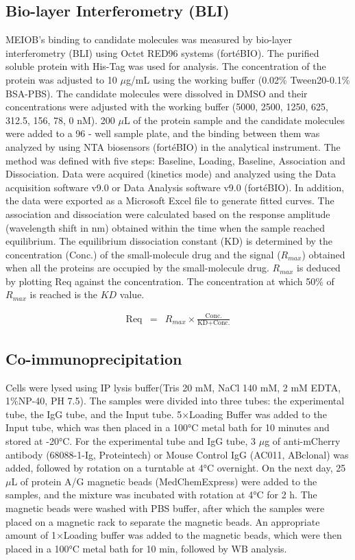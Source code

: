 \documentclass[unnumsec,webpdf,contemporary,large]{oup-authoring-template}%
\theoremstyle{thmstyleone}%
\theoremstyle{thmstyletwo}%
\theoremstyle{thmstylethree}%
\begin{document}
\subsection*{Bio-layer Interferometry (BLI)}

MEIOB's binding to candidate molecules was measured by bio-layer interferometry (BLI) using Octet RED96 systems (fortéBIO). The purified soluble protein with His-Tag was used for analysis. The concentration of the protein was adjusted to 10 $\mu$g/mL using the working buffer (0.02\% Tween20-0.1\% BSA-PBS). The candidate molecules were dissolved in DMSO and their concentrations were adjusted with the working buffer (5000, 2500, 1250, 625, 312.5, 156, 78, 0 nM). 200 $\mu$L of the protein sample and the candidate molecules were added to a 96 - well sample plate, and the binding between them was analyzed by using NTA biosensors (fortéBIO) in the analytical instrument. The method was defined with five steps: Baseline, Loading, Baseline, Association and Dissociation. Data were acquired (kinetics mode) and analyzed using the Data acquisition software v9.0 or Data Analysis software v9.0 (fortéBIO). In addition, the data were exported as a Microsoft Excel file to generate fitted curves. The association and dissociation were calculated based on the response amplitude (wavelength shift in nm) obtained within the time when the sample reached equilibrium. The equilibrium dissociation constant ($\text{KD}$) is determined by the concentration ($\text{Conc.}$) of the small-molecule drug and the signal ($R_{max}$) obtained when all the proteins are occupied by the small-molecule drug. $R_{max}$ is deduced by plotting $\text{Req}$ against the concentration. The concentration at which 50\% of $R_{max}$ is reached is the $KD$ value.

\begin{eqnarray}
\text{Req} & = & R_{max} \times  \frac{\text{Conc.}}{\text{KD} + \text{Conc.}} 
\end{eqnarray}


\subsection*{Co-immunoprecipitation}
Cells were lysed using IP lysis buffer(Tris 20 mM, NaCl 140 mM, 2 mM EDTA, 1\%NP-40, PH 7.5). The samples were divided into three tubes: the experimental tube, the IgG tube, and the Input tube. 5×Loading Buffer was added to the Input tube, which was then placed in a 100°C metal bath for 10 minutes and stored at -20°C. For the experimental tube and IgG tube, 3 $\mu$g of anti-mCherry antibody (68088-1-Ig, Proteintech) or Mouse Control IgG (AC011, ABclonal) was added, followed by rotation on a turntable at 4°C overnight. On the next day, 25 $\mu$L of protein A/G magnetic beads (MedChemExpress) were added to the samples, and the mixture was incubated with rotation at 4°C for 2 h. The magnetic beads were washed with PBS buffer, after which the samples were placed on a magnetic rack to separate the magnetic beads. An appropriate amount of 1×Loading buffer was added to the magnetic beads, which were then placed in a 100°C metal bath for 10 min, followed by WB analysis.
\end{document}
